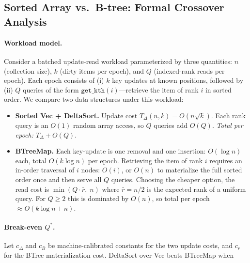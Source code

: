 
\subsection{Sorted Array vs.\ B-tree: Formal Crossover Analysis}
\label{sec:qbreak}

\paragraph{Workload model.}
Consider a batched update-read workload parameterized by three quantities:
$n$ (collection size), $k$ (dirty items per epoch), and $Q$ (indexed-rank reads per epoch).
Each epoch consists of (i) $k$ key updates at known positions, followed by (ii) $Q$ queries of
the form $\texttt{get\_kth}(i)$---retrieve the item of rank $i$ in sorted order.
We compare two data structures under this workload:

\begin{itemize}
  \item \textbf{Sorted Vec + DeltaSort.} Update cost $T_\Delta(n,k) = O(n\sqrt{k})$.
    Each rank query is an $O(1)$ random array access, so $Q$ queries add $O(Q)$.
    \emph{Total per epoch:} $T_\Delta + O(Q)$.

  \item \textbf{BTreeMap.} Each key-update is one removal and one insertion: $O(\log n)$ each,
    total $O(k \log n)$ per epoch.
    Retrieving the item of rank $i$ requires an in-order traversal of $i$ nodes: $O(i)$,
    or $O(n)$ to materialize the full sorted order once and then serve all $Q$ queries.
    Choosing the cheaper option, the read cost is $\min(Q \cdot \bar{r},\; n)$
    where $\bar{r} = n/2$ is the expected rank of a uniform query.
    For $Q \geq 2$ this is dominated by $O(n)$, so total per epoch $\approx O(k \log n + n)$.
\end{itemize}

\paragraph{Break-even $Q^*$.}
Let $c_\Delta$ and $c_B$ be machine-calibrated constants for the two update costs, and $c_r$ for
the BTree materialization cost.  DeltaSort-over-Vec beats BTreeMap when


